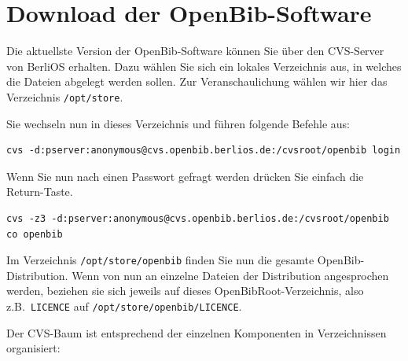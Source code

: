 \documentclass[11pt, twoside, a4paper, BCOR8mm, DIV12, bibtotoc,idxtotoc]{scrbook}
\begin{document}
\chapter{Download der OpenBib-Software}

Die aktuellste Version der OpenBib-Software können Sie über den
CVS-Server von BerliOS erhalten. Dazu wählen Sie sich ein lokales
Verzeichnis aus, in welches die Dateien abgelegt werden sollen. Zur
Veranschaulichung wählen wir hier das Verzeichnis \texttt{/opt/store}.

Sie wechseln nun in dieses Verzeichnis und führen folgende Befehle
aus: 

\begin{verbatim}
cvs -d:pserver:anonymous@cvs.openbib.berlios.de:/cvsroot/openbib login
\end{verbatim}

Wenn Sie nun nach einen Passwort gefragt werden drücken Sie einfach
die Return-Taste.

\begin{verbatim}
cvs -z3 -d:pserver:anonymous@cvs.openbib.berlios.de:/cvsroot/openbib co openbib
\end{verbatim}

Im Verzeichnis \texttt{/opt/store/openbib} finden Sie nun die gesamte
OpenBib-Distribution. Wenn von nun an einzelne Dateien der
Distribution angesprochen werden, beziehen sie sich jeweils auf dieses
OpenBibRoot-Verzeichnis, also z.B.~\texttt{LICENCE} auf \texttt{/opt/store/openbib/LICENCE}.

Der CVS-Baum ist entsprechend der einzelnen Komponenten in
Verzeichnissen organisiert:
\end{document}
